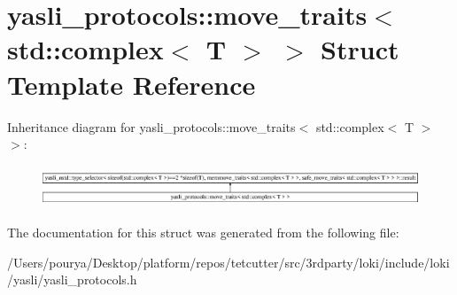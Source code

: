 \hypertarget{structyasli__protocols_1_1move__traits_3_01std_1_1complex_3_01T_01_4_01_4}{}\section{yasli\+\_\+protocols\+:\+:move\+\_\+traits$<$ std\+:\+:complex$<$ T $>$ $>$ Struct Template Reference}
\label{structyasli__protocols_1_1move__traits_3_01std_1_1complex_3_01T_01_4_01_4}
Inheritance diagram for yasli\+\_\+protocols\+:\+:move\+\_\+traits$<$ std\+:\+:complex$<$ T $>$ $>$\+:\begin{figure}[H]
\begin{center}
\leavevmode
\includegraphics[height=1.261261cm]{structyasli__protocols_1_1move__traits_3_01std_1_1complex_3_01T_01_4_01_4}
\end{center}
\end{figure}


The documentation for this struct was generated from the following file\+:\begin{DoxyCompactItemize}
\item 
/\+Users/pourya/\+Desktop/platform/repos/tetcutter/src/3rdparty/loki/include/loki/yasli/yasli\+\_\+protocols.\+h\end{DoxyCompactItemize}
